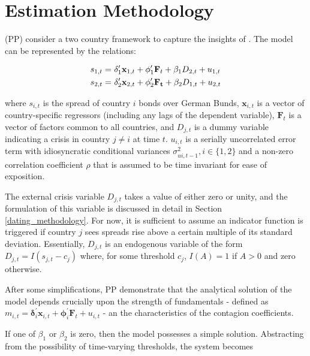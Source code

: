 \documentclass[../base.tex]{subfiles}
\begin{document}
\section{Estimation Methodology}
\label{est}

\cite{pesaran2007econometric} (PP) consider a two country framework to capture the insights of \cite{masson1999contagion}. The model can be represented by the relations:

\begin{align} 
	s_{1,t} =&~\mathbf{\delta}_1^{\prime} \mathbf{x}_{1,t} + \mathbf{\phi}_1^{\prime} \mathbf{F}_t + \beta_1 D_{2,t} + u_{1,t} \label{eqn:system}\\
	s_{2,t} =&~\boldmath{\delta}_2^{\prime} \mathbf{x}_{2,t} + \mathbf{\phi}_2^{\prime} \mathbf{F_t} + \beta_2 D_{1,t} + u_{2,t} \label{eqn:system2}
\end{align}

where $s_{i,t}$ is the spread of country $i$ bonds over German Bunds, $\mathbf{x}_{i,t}$ is a vector of country-specific regressors (including any lags of the dependent variable), $\mathbf{F}_t$ is a vector of factors common to all countries, and $D_{j, t}$ is a dummy variable indicating a crisis in country $j \neq i$ at time $t$. $u_{i, t}$ is a serially uncorrelated error term with idiosyncratic conditional variances $\sigma^2_{ui, t-1}, i \in \{1, 2\}$ and a non-zero correlation coefficient $\rho$ that is assumed to be time invariant for ease of exposition. 

The external crisis variable $D_{j, t}$ takes a value of either zero or unity, and the formulation of this variable is discussed in detail in Section \ref{dating_methodology}. For now, it is sufficient to assume an indicator function is triggered if country $j$ sees spreads rise above a certain multiple of its standard deviation. Essentially, $D_{j,t}$ is an endogenous variable of the form $D_{j, t} = I(s_{j, t} - c_j)$ where, for some threshold $c_j$, $I(A) = 1$ if $A >0$ and zero otherwise.

After some simplifications, PP demonstrate that the analytical solution of the model depends crucially upon the strength of fundamentals - defined as $m_{i,t} = \mathbf{\delta}_i^{\prime} \mathbf{x}_{i,t} + \mathbf{\phi}_i^{\prime} \mathbf{F}_t + u_{i,t}$ - an the characteristics of the contagion coefficients. 

If one of $\beta_1$ or $\beta_2$ is zero, then the model possesses a simple solution. Abstracting from the possibility of time-varying thresholds, the system becomes
\end{document}
